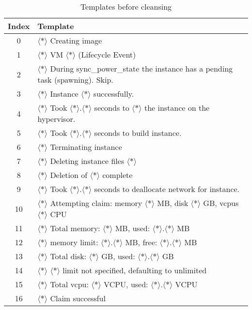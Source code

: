 \begin{table}[ht]
\begin{small}
\centering
\begin{tabular}{ c l } 
\toprule
Index & Template \\
\midrule
0 & $\langle*\rangle$ Creating image\\
1 & $\langle*\rangle$ VM $\langle*\rangle$ (Lifecycle Event)\\
2 & $\langle*\rangle$ During sync\_power\_state the instance has a pending task (spawning). Skip.\\
3 & $\langle*\rangle$ Instance $\langle*\rangle$ successfully.\\
4 & $\langle*\rangle$ Took $\langle*\rangle$.$\langle*\rangle$ seconds to $\langle*\rangle$ the instance on the hypervisor.\\
5 & $\langle*\rangle$ Took $\langle*\rangle$.$\langle*\rangle$ seconds to build instance.\\
6 & $\langle*\rangle$ Terminating instance\\
7 & $\langle*\rangle$ Deleting instance files $\langle*\rangle$\\
8 & $\langle*\rangle$ Deletion of $\langle*\rangle$ complete\\
9 & $\langle*\rangle$ Took $\langle*\rangle$.$\langle*\rangle$ seconds to deallocate network for instance.\\
10 & $\langle*\rangle$ Attempting claim: memory $\langle*\rangle$ MB, disk $\langle*\rangle$ GB, vcpus $\langle*\rangle$ CPU\\
11 & $\langle*\rangle$ Total memory: $\langle*\rangle$ MB, used: $\langle*\rangle$.$\langle*\rangle$ MB\\
12 & $\langle*\rangle$ memory limit: $\langle*\rangle$.$\langle*\rangle$ MB, free: $\langle*\rangle$.$\langle*\rangle$ MB\\
13 & $\langle*\rangle$ Total disk: $\langle*\rangle$ GB, used: $\langle*\rangle$.$\langle*\rangle$ GB\\
14 & $\langle*\rangle$ $\langle*\rangle$ limit not specified, defaulting to unlimited\\
15 & $\langle*\rangle$ Total vcpu: $\langle*\rangle$ VCPU, used: $\langle*\rangle$.$\langle*\rangle$ VCPU\\
16 & $\langle*\rangle$ Claim successful\\
\bottomrule
\end{tabular}
\caption{Templates before cleansing}
\label{tab:templates_before_cleansing}
\end{small}
\end{table}



